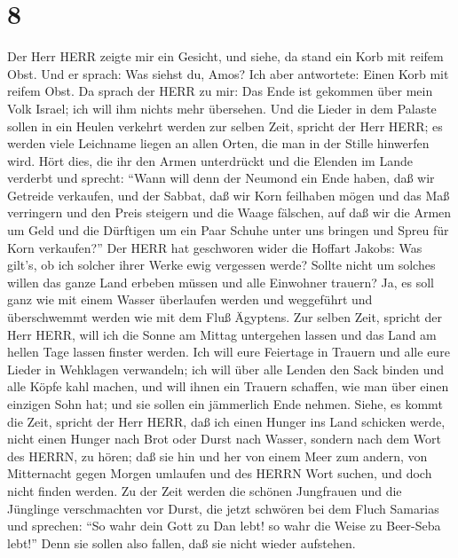 \hypertarget{section-7}{%
\section{8}\label{section-7}}

 Der Herr HERR zeigte mir ein Gesicht, und siehe, da stand
ein Korb mit reifem Obst.  Und er sprach: Was siehst du,
Amos? Ich aber antwortete: Einen Korb mit reifem Obst. Da sprach der
HERR zu mir: Das Ende ist gekommen über mein Volk Israel; ich will ihm
nichts mehr übersehen.  Und die Lieder in dem Palaste sollen
in ein Heulen verkehrt werden zur selben Zeit, spricht der Herr HERR; es
werden viele Leichname liegen an allen Orten, die man in der Stille
hinwerfen wird.  Hört dies, die ihr den Armen unterdrückt
und die Elenden im Lande verderbt  und sprecht: ``Wann will
denn der Neumond ein Ende haben, daß wir Getreide verkaufen, und der
Sabbat, daß wir Korn feilhaben mögen und das Maß verringern und den
Preis steigern und die Waage fälschen,  auf daß wir die
Armen um Geld und die Dürftigen um ein Paar Schuhe unter uns bringen und
Spreu für Korn verkaufen?''  Der HERR hat geschworen wider
die Hoffart Jakobs: Was gilt's, ob ich solcher ihrer Werke ewig
vergessen werde?  Sollte nicht um solches willen das ganze
Land erbeben müssen und alle Einwohner trauern? Ja, es soll ganz wie mit
einem Wasser überlaufen werden und weggeführt und überschwemmt werden
wie mit dem Fluß Ägyptens.  Zur selben Zeit, spricht der
Herr HERR, will ich die Sonne am Mittag untergehen lassen und das Land
am hellen Tage lassen finster werden.  Ich will eure
Feiertage in Trauern und alle eure Lieder in Wehklagen verwandeln; ich
will über alle Lenden den Sack binden und alle Köpfe kahl machen, und
will ihnen ein Trauern schaffen, wie man über einen einzigen Sohn hat;
und sie sollen ein jämmerlich Ende nehmen.  Siehe, es kommt
die Zeit, spricht der Herr HERR, daß ich einen Hunger ins Land schicken
werde, nicht einen Hunger nach Brot oder Durst nach Wasser, sondern nach
dem Wort des HERRN, zu hören;  daß sie hin und her von
einem Meer zum andern, von Mitternacht gegen Morgen umlaufen und des
HERRN Wort suchen, und doch nicht finden werden.  Zu der
Zeit werden die schönen Jungfrauen und die Jünglinge verschmachten vor
Durst,  die jetzt schwören bei dem Fluch Samarias und
sprechen: ``So wahr dein Gott zu Dan lebt! so wahr die Weise zu
Beer-Seba lebt!'' Denn sie sollen also fallen, daß sie nicht wieder
aufstehen.

